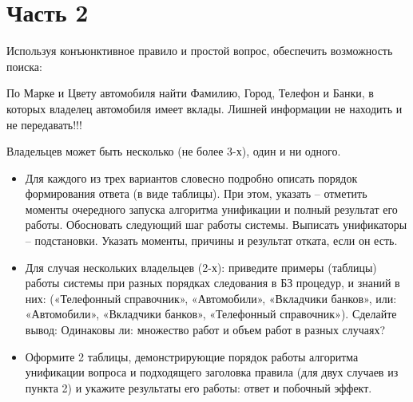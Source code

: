 \documentclass[a4paper,14pt, unknownkeysallowed]{extreport}
\begin{document}
\section{Часть 2}

Используя конъюнктивное правило и простой вопрос, обеспечить возможность поиска:

По Марке и Цвету автомобиля найти Фамилию, Город, Телефон и Банки, в которых владелец автомобиля имеет вклады. Лишней информации не находить и не передавать!!!

Владельцев может быть несколько (не более 3-х), один и ни одного.

\begin{itemize}
	\item Для каждого из трех вариантов словесно подробно описать порядок формирования ответа (в виде таблицы). При этом, указать -- отметить моменты очередного запуска алгоритма унификации и полный результат его работы. Обосновать следующий шаг работы системы. Выписать унификаторы -- подстановки. Указать моменты, причины и результат отката, если он есть.
	\item Для случая нескольких владельцев (2-х): приведите примеры (таблицы) работы системы при разных порядках следования в БЗ процедур, и знаний в них: («Телефонный справочник», «Автомобили», «Вкладчики банков», или: «Автомобили», «Вкладчики банков», «Телефонный справочник»). Сделайте вывод: Одинаковы ли: множество работ и объем работ в разных случаях?
	\item Оформите 2 таблицы, демонстрирующие порядок работы алгоритма унификации вопроса и подходящего заголовка правила (для двух случаев из пункта 2) и укажите результаты его работы: ответ и побочный эффект.
\end{itemize}
\end{document}
